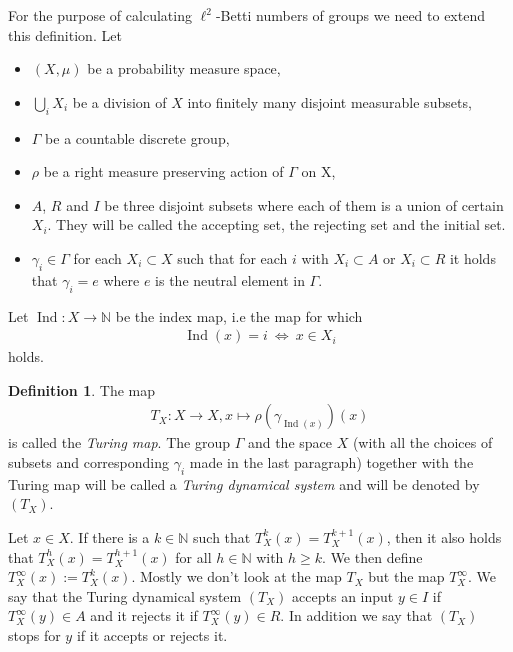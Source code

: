 \documentclass[12pt,a4paper]{scrartcl}
\theoremstyle{plain}
\theoremstyle{definition}
\newtheorem{Definition}[Theorem]{Definition}
\newcommand{\N}{\mathbb{N}} %
\newcommand{\2}{\mathbb{Z} / 2 \mathbb{Z}}
\newcommand{\1}{\bar{1}}
\newcommand{\0}{\bar{0}}
\newcommand{\Ind}{\operatorname{Ind}}
\begin{document}
For the purpose of calculating $\ell^2$-Betti numbers of groups we need to extend this definition. 
Let
\begin{itemize}
	\item $(X, \mu)$ be a probability measure space,
	\item $\bigcup_{i} X_i$ be a division of $X$ into finitely many disjoint measurable subsets,
	\item $\Gamma$ be a countable discrete group,
	\item $\rho$ be a right measure preserving action of $\Gamma$ on X,
	\item $A$, $R$ and $I$ be three disjoint subsets where each of them is a union of certain $X_i$. They will be called the accepting set, the rejecting set and the initial set.
	\item $\gamma_i \in \Gamma$ for each $X_i \subset X$ such that for each $i$ with $X_i \subset A$ or $X_i \subset R$ it holds that $\gamma_i = e$ where $e$ is the neutral element in $\Gamma$.
\end{itemize}
Let $\Ind\colon X \to \N$ be the index map, i.e the map for which
\begin{align*}
	\Ind(x) = i ~\Leftrightarrow~ x \in X_i
\end{align*}
holds.
\begin{Definition}
	 The map 
	 \begin{align*}
	 T_X\colon X \to X, x \mapsto \rho(\gamma_{\Ind(x)})(x)
	 \end{align*}
	 is called the \emph{Turing map}.
	 The group $\Gamma$ and the space $X$ (with all the choices of subsets and corresponding $\gamma_i$ made in the last paragraph) together with the Turing map will be called a \emph{Turing dynamical system} and will be denoted by $(T_X)$.
\end{Definition}
Let $x \in X$. If there is a $k \in \N$ such that $T_X^k(x) = T_X^{k + 1}(x)$, then it also holds that $T_X^h(x) = T_X^{h + 1}(x)$ for all $h \in \N$ with $h \geq k$. We then define $T_X^\infty (x) := T_X^k(x)$. Mostly we don't look at the map $T_X$ but the map $T_X^\infty$. We say that the Turing dynamical system $(T_X)$ accepts an input $y \in I$ if $T_X^\infty(y) \in A$ and it rejects it if $T_X^\infty(y) \in R$. In addition we say that $(T_X)$ stops for $y$ if it accepts or rejects it.
\end{document}
